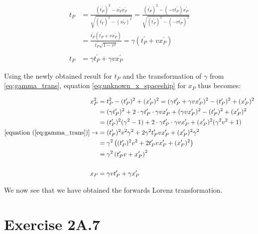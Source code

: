 \documentclass[a4paper,10pt,english]{article}
\begin{document}
\begin{enumerate}
\begin{align*}
t_{P}&=\frac{(t_{P}^{\prime})^{2}-x_{Y}^{\prime}x_{P}^{\prime}}{\sqrt{(t_{Y}^{\prime})^2-(x_{Y}^{\prime})^2}}=\frac{(t_{P}^{\prime})^{2}-(-vt_{P}^{\prime})x_{P}^{\prime}}{\sqrt{(t_{P}^{\prime})^2-(-vt_{P}^{\prime})^2}}\\
&=\frac{t_{P}^{\prime}\left(t_{P}^{\prime}+vx_{P}^{\prime}\right)}{t_{P}^{\prime}\sqrt{1-v^2}}=\gamma(t_{P}^{\prime}+vx_{P}^{\prime})\\
\\
t_{P}&=\gamma t_{P}^{\prime}+\gamma vx_{P}^{\prime}
\end{align*}

Using the newly obtained result for $t_{P}$ and the transformation of $\gamma$ from \ref{eq:gamma_trans}, equation \ref{eq:unknown_x_spaceship} for $x_{P}$ thus becomes:

\begin{align*}
x_{P}^{2}&=t_{P}^{2}-(t^{\prime}_{P})^{2}+(x^{\prime}_{P})^{2}=(\gamma t_{P}^{\prime}+\gamma vx_{P}^{\prime})^{2}-(t^{\prime}_{P})^{2}+(x^{\prime}_{P})^{2}\\
&=(\gamma t_{P}^{\prime})^{2}+2\cdot\gamma t_{P}^{\prime}\cdot\gamma vx_{P}^{\prime}+(\gamma vx_{P}^{\prime})^{2}-(t^{\prime}_{P})^{2}+(x^{\prime}_{P})^{2}\\
&=(t^{\prime}_{P})^{2}(\gamma^{2}-1)+2\cdot\gamma t_{P}^{\prime}\cdot\gamma vx_{P}^{\prime}+(x^{\prime}_{P})^{2}(\gamma^{2}v^{2}+1)\\
[\text{equation }(\ref{eq:gamma_trans})]\rightarrow&=(t^{\prime}_{P})^{2}v^{2}\gamma^{2}+2\gamma^{2}t_{P}^{\prime}vx_{P}^{\prime}+(x^{\prime}_{P})^{2}\gamma^{2}\\
&=\gamma^{2}\left((t^{\prime}_{P})^{2}v^{2}+2t_{P}^{\prime}vx_{P}^{\prime}+(x^{\prime}_{P})^{2}\right)\\
&=\gamma^{2}\left(t^{\prime}_{P}v+x^{\prime}_{P}\right)^{2}\\
\\
x_{P}&=\gamma vt^{\prime}_{P}+\gamma x^{\prime}_{P}
\end{align*}

We now see that we have obtained the forwards Lorenz transformation.

\end{enumerate}








\section*{Exercise 2A.7}
\end{document}
